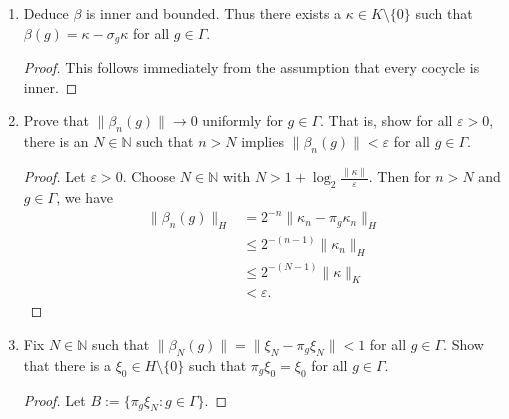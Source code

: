 \documentclass[a4paper,10pt]{report}
\newcommand{\eps}{\varepsilon}
\newcommand{\N}{\mathbb{N}}
\begin{document}
\begin{enumerate}
\begin{enumerate}
\begin{proof}
					Now we must check that $\beta$ is a cocycle.
					Let $g, h \in \Gamma$.
					Since $\beta_n$ is a cocycle for each $n \in \N$, we have
					\begin{align*}
						\beta(gh) & = \left( 2^n \beta_n(gh) \right)_{n \in \N} \\
						 & = \left( 2^n (\beta_n(g) + \pi_g\beta_n(h)) \right)_{n \in \N} \\
						 & = \left( 2^n \beta_n(g) \right)_{n \in \N}
						 + \left( \pi_g 2^n \beta_n(h) \right)_{n \in \N} \\
						 & = \left( 2^n \beta_n(g) \right)_{n \in \N}
						 + \sigma_g \left( 2^n \beta_n(h) \right)_{n \in \N} \\
						 & = \beta(g) + \sigma_g \beta(h).
					\end{align*}
					That is, $\beta$ is a cocycle.
				\end{proof}
			\item Deduce $\beta$ is inner and bounded.
				Thus there exists a $\kappa \in K \setminus \{0\}$
				such that $\beta(g) = \kappa - \sigma_g \kappa$ for all $g \in \Gamma$.
				\begin{proof}
					This follows immediately from the assumption that every cocycle is inner.
				\end{proof}
			\item Prove that $\|\beta_n(g)\| \to 0$ uniformly for $g \in \Gamma$.
				That is, show for all $\eps > 0$, there is an $N \in \N$ such that
				$n > N$ implies $\|\beta_n(g)\| < \eps$ for all $g \in \Gamma$.
				\begin{proof}
					Let $\eps > 0$.
					Choose $N \in \N$ with $N > 1 + \log_2{\frac{\|\kappa\|}{\eps}}$.
					Then for $n > N$ and $g \in \Gamma$, we have
					\begin{align*}
						\|\beta_n(g)\|_H & = 2^{-n}\|\kappa_n - \pi_g\kappa_n\|_H \\
						 & \le 2^{-(n-1)} \|\kappa_n\|_H \\
						 & \le 2^{-(N-1)} \|\kappa\|_K \\
						 & < \eps.
					\end{align*}
				\end{proof}
			\item Fix $N \in \N$ such that $\|\beta_N(g)\| = \|\xi_N - \pi_g\xi_N\| < 1$
				for all $g \in \Gamma$.
				Show that there is a $\xi_0 \in H \setminus \{0\}$
				such that $\pi_g\xi_0 = \xi_0$ for all $g \in \Gamma$.
				\begin{proof}
					Let $B := \{\pi_g\xi_N : g \in \Gamma\}$.

\end{proof}
\end{enumerate}
\end{enumerate}
\end{document}
